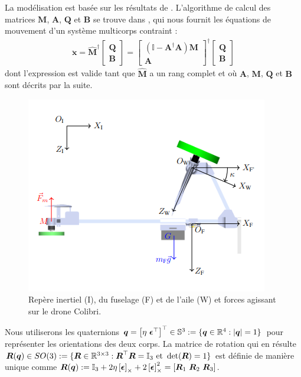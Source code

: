 La modélisation est basée sur les résultats de \cite[Section 2.15]{udwadia-phohomsiri}. L'algorithme de calcul des matrices $\boldsymbol{M}$, $\boldsymbol{A}$, $\boldsymbol{Q}$ et $\boldsymbol{B}$ se trouve dans \cite{udwadia-schutte}, qui nous fournit les équations de mouvement d'un système multicorps contraint : 
\begin{align}
\label{eq:udwadia}
    \ddot{\boldsymbol{x}} = \hat{\boldsymbol{M}}^{\dag} \begin{bmatrix} \boldsymbol{Q} \\ \boldsymbol{B} \end{bmatrix}  = \begin{bmatrix} (\mathbb{I} - \boldsymbol{A}^{\dag}\boldsymbol{A})\boldsymbol{M} \\ \boldsymbol{A} \end{bmatrix}^{\dag} \begin{bmatrix} \boldsymbol{Q} \\ \boldsymbol{B} \end{bmatrix}
\end{align}
dont l'expression est valide tant que $\hat{\boldsymbol{M}}$ a un rang complet et où $\boldsymbol{A}$, $\boldsymbol{M}$, $\boldsymbol{Q}$ et $\boldsymbol{B}$ sont décrits par la suite.

\begin{figure}[ht!]
    \centering
    \includegraphics[width=0.6\columnwidth,angle=0,trim={0 0 0 0.5cm},clip]{figures/fram_side_colibri.png}
    \caption{Repère inertiel (I), du fuselage (F) et de l'aile (W) et forces agissant sur le drone Colibri.}
    \label{fig:colibri_frame_side}
\end{figure}
Nous utiliserons les quaternions $\boldsymbol{q} = \left[ \eta ~ \boldsymbol{\epsilon}^\top \right]^\top  \in {\mathbb S}^3:=\{ \boldsymbol{q}\in {\mathbb R}^4: |\boldsymbol{q}| = 1\}$ pour représenter les orientations des deux corps. La matrice de rotation qui en résulte $\boldsymbol{R}(\boldsymbol{q}) \in SO(3): = \{\boldsymbol{R}\in {\mathbb R}^{3\times 3}: \boldsymbol{R}^\top \boldsymbol{R} = \mathbb{I}_{3} \text{ et}~\det(\boldsymbol{R})=1\}$ est définie de manière unique comme $\boldsymbol{R}(\boldsymbol{q}) := \mathbb{I}_{3} +2\eta \left[\boldsymbol{\epsilon}\right]_{\times} + 2\left[\boldsymbol{\epsilon}\right]_{\times}^{2} = [\boldsymbol{R}_{1}~\boldsymbol{R}_{2}~\boldsymbol{R}_{3}]$.

